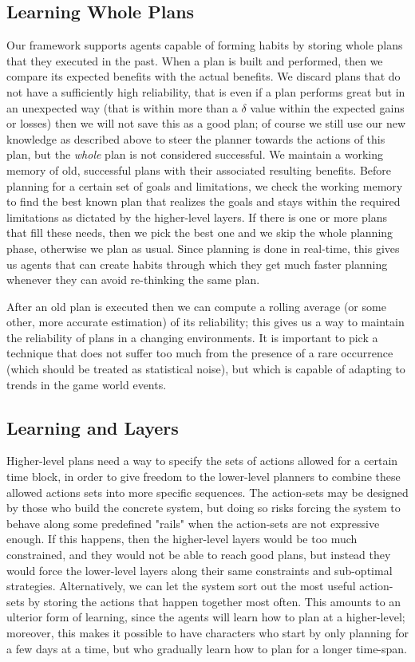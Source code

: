 \subsection{Learning Whole Plans}
Our framework supports agents capable of forming habits by storing whole plans that they executed in the past. When a plan is built and performed, then we compare its expected benefits with the actual benefits. We discard plans that do not have a sufficiently high reliability, that is even if a plan performs great but in an unexpected way (that is within more than a $\delta$ value within the expected gains or losses) then we will not save this as a good plan; of course we still use our new knowledge as described above to steer the planner towards the actions of this plan, but the \textit{whole} plan is not considered successful. We maintain a working memory of old, successful plans with their associated resulting benefits. Before planning for a certain set of goals and limitations, we check the working memory to find the best known plan that realizes the goals and stays within the required limitations as dictated by the higher-level layers. If there is one or more plans that fill these needs, then we pick the best one and we skip the whole planning phase, otherwise we plan as usual. Since planning is done in real-time, this gives us agents that can create habits through which they get much faster planning whenever they can avoid re-thinking the same plan.

After an old plan is executed then we can compute a rolling average (or some other, more accurate estimation) of its reliability; this gives us a way to maintain the reliability of plans in a changing environments. It is important to pick a technique that does not suffer too much from the presence of a rare occurrence (which should be treated as statistical noise), but which is capable of adapting to trends in the game world events.


\subsection{Learning and Layers}
Higher-level plans need a way to specify the sets of actions allowed for a certain time block, in order to give freedom to the lower-level planners to combine these allowed actions sets into more specific sequences. The action-sets may be designed by those who build the concrete system, but doing so risks forcing the system to behave along some predefined "rails" when the action-sets are not expressive enough. If this happens, then the higher-level layers would be too much constrained, and they would not be able to reach good plans, but instead they would force the lower-level layers along their same constraints and sub-optimal strategies. Alternatively, we can let the system sort out the most useful action-sets by storing the actions that happen together most often. This amounts to an ulterior form of learning, since the agents will learn how to plan at a higher-level; moreover, this makes it possible to have characters who start by only planning for a few days at a time, but who gradually learn how to plan for a longer time-span.


